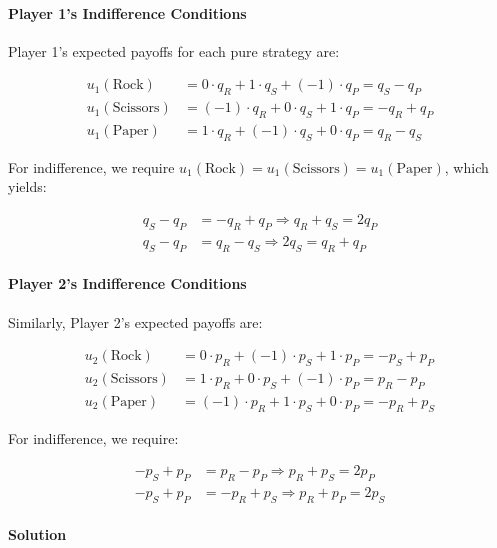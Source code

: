 \documentclass[conference]{IEEEtran}
\begin{document}
\paragraph{Player 1's Indifference Conditions}

Player 1's expected payoffs for each pure strategy are:

\begin{align}
u_1(\text{Rock}) &= 0 \cdot q_R + 1 \cdot q_S + (-1) \cdot q_P = q_S - q_P \\
u_1(\text{Scissors}) &= (-1) \cdot q_R + 0 \cdot q_S + 1 \cdot q_P = -q_R + q_P \\
u_1(\text{Paper}) &= 1 \cdot q_R + (-1) \cdot q_S + 0 \cdot q_P = q_R - q_S
\end{align}

For indifference, we require $u_1(\text{Rock}) = u_1(\text{Scissors}) = u_1(\text{Paper})$, which yields:

\begin{align}
q_S - q_P &= -q_R + q_P \Rightarrow q_R + q_S = 2q_P \label{eq:rsp1} \\
q_S - q_P &= q_R - q_S \Rightarrow 2q_S = q_R + q_P \label{eq:rsp2}
\end{align}

\paragraph{Player 2's Indifference Conditions}

Similarly, Player 2's expected payoffs are:

\begin{align}
u_2(\text{Rock}) &= 0 \cdot p_R + (-1) \cdot p_S + 1 \cdot p_P = -p_S + p_P \\
u_2(\text{Scissors}) &= 1 \cdot p_R + 0 \cdot p_S + (-1) \cdot p_P = p_R - p_P \\
u_2(\text{Paper}) &= (-1) \cdot p_R + 1 \cdot p_S + 0 \cdot p_P = -p_R + p_S
\end{align}

For indifference, we require:

\begin{align}
-p_S + p_P &= p_R - p_P \Rightarrow p_R + p_S = 2p_P \label{eq:rsp3} \\
-p_S + p_P &= -p_R + p_S \Rightarrow p_R + p_P = 2p_S \label{eq:rsp4}
\end{align}

\paragraph{Solution}
\end{document}
